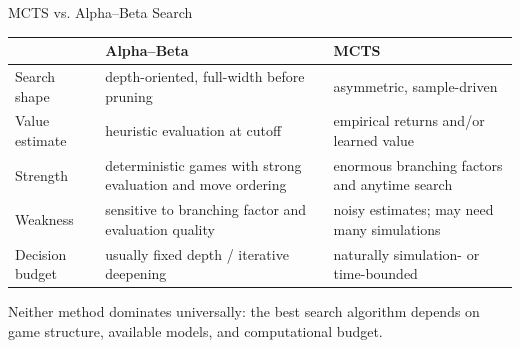 \documentclass[aspectratio=169,10pt]{beamer}
\begin{document}
\begin{frame}[shrink=16]{MCTS vs. Alpha--Beta Search}
  \begin{center}
  \renewcommand{\arraystretch}{1.25}
  \begin{tabular}{p{}|p{}|p{}}
    & \textbf{Alpha--Beta} & \textbf{MCTS} \\ \hline
    Search shape & depth-oriented, full-width before pruning & asymmetric, sample-driven \\
    Value estimate & heuristic evaluation at cutoff & empirical returns and/or learned value \\
    Strength & deterministic games with strong evaluation and move ordering & enormous branching factors and anytime search \\
    Weakness & sensitive to branching factor and evaluation quality & noisy estimates; may need many simulations \\
    Decision budget & usually fixed depth / iterative deepening & naturally simulation- or time-bounded
  \end{tabular}
  \end{center}
  \begin{keyidea}
    Neither method dominates universally: the best search algorithm depends on game structure, available models, and computational budget.
  \end{keyidea}
\end{frame}
\end{document}
